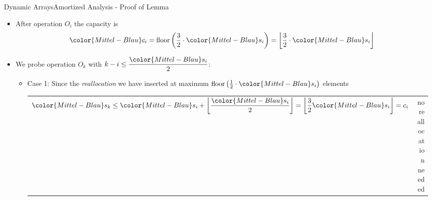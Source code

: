 \begin{frame}{Dynamic Arrays}{Amortized Analysis - Proof of Lemma}
  \begin{itemize}
    \item
      After operation {\color{Mittel-Blau}$O_i$} the capacity is
      \[
        {\color{Mittel-Blau}c_i}
        = \mathrm{floor}\left(\frac{3}{2}\cdot{\color{Mittel-Blau}s_i}\right)
        = \left\lfloor \frac{3}{2}\cdot{\color{Mittel-Blau}s_i} \right\rfloor
      \]
    \item
      We probe operation {\color{Mittel-Blau}$O_k$} with
      $k -i \leq \dfrac{\color{Mittel-Blau}s_i}{2}$:
      \begin{itemize}
        \item
          Case 1: Since the \textit{reallocation} we have inserted at
          maximum
          $\mathrm{floor}\left(
            \frac{1}{2} \cdot {\color{Mittel-Blau}s_i}
          \right)$ elements
          \vspace{0.5em}\\
          \begin{tabularx}{\linewidth}{Xr}
            ${\color{Mittel-Blau}s_k}
              \leq {\color{Mittel-Blau}s_i} +
                \left\lfloor
                  \dfrac{\color{Mittel-Blau}s_i}{2}
                  \vphantom{\dfrac{3}{2}}
                \right\rfloor
              = \left\lfloor\dfrac{3}{2} {\color{Mittel-Blau}s_i}\right\rfloor
              = c_i$ &
              {\color{Mittel-Blau}no reallocation needed}
          \end{tabularx}
      \end{itemize}
  \end{itemize}
\end{frame}


